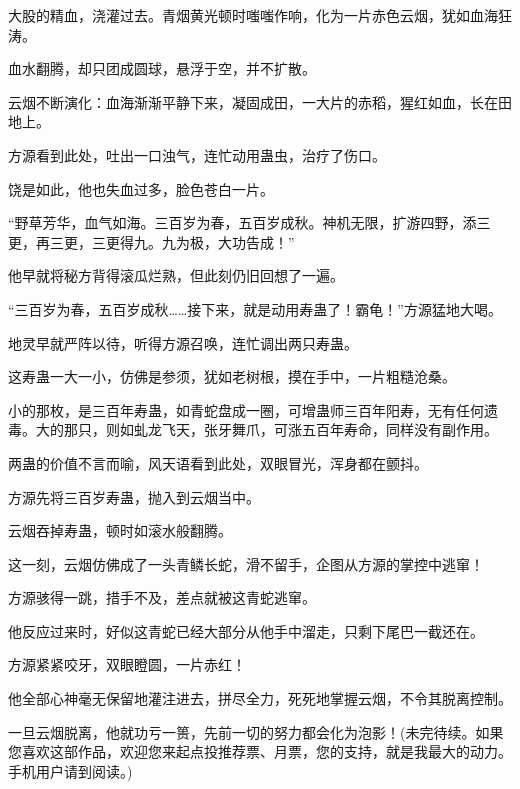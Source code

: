 \begin{this_body}
大股的精血，浇灌过去。青烟黄光顿时嗤嗤作响，化为一片赤色云烟，犹如血海狂涛。

血水翻腾，却只团成圆球，悬浮于空，并不扩散。

云烟不断演化：血海渐渐平静下来，凝固成田，一大片的赤稻，猩红如血，长在田地上。

方源看到此处，吐出一口浊气，连忙动用蛊虫，治疗了伤口。

饶是如此，他也失血过多，脸色苍白一片。

“野草芳华，血气如海。三百岁为春，五百岁成秋。神机无限，扩游四野，添三更，再三更，三更得九。九为极，大功告成！”

他早就将秘方背得滚瓜烂熟，但此刻仍旧回想了一遍。

“三百岁为春，五百岁成秋……接下来，就是动用寿蛊了！霸龟！”方源猛地大喝。

地灵早就严阵以待，听得方源召唤，连忙调出两只寿蛊。

这寿蛊一大一小，仿佛是参须，犹如老树根，摸在手中，一片粗糙沧桑。

小的那枚，是三百年寿蛊，如青蛇盘成一圈，可增蛊师三百年阳寿，无有任何遗毒。大的那只，则如虬龙飞天，张牙舞爪，可涨五百年寿命，同样没有副作用。

两蛊的价值不言而喻，风天语看到此处，双眼冒光，浑身都在颤抖。

方源先将三百岁寿蛊，抛入到云烟当中。

云烟吞掉寿蛊，顿时如滚水般翻腾。

这一刻，云烟仿佛成了一头青鳞长蛇，滑不留手，企图从方源的掌控中逃窜！

方源骇得一跳，措手不及，差点就被这青蛇逃窜。

他反应过来时，好似这青蛇已经大部分从他手中溜走，只剩下尾巴一截还在。

方源紧紧咬牙，双眼瞪圆，一片赤红！

他全部心神毫无保留地灌注进去，拼尽全力，死死地掌握云烟，不令其脱离控制。

一旦云烟脱离，他就功亏一篑，先前一切的努力都会化为泡影！(未完待续。如果您喜欢这部作品，欢迎您来起点投推荐票、月票，您的支持，就是我最大的动力。手机用户请到阅读。)

\end{this_body}

